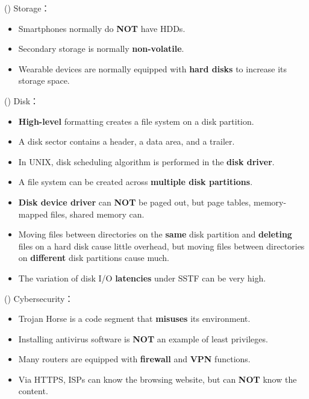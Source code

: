 \begin{theorem}{()} Storage： \begin{itemize}
        \item Smartphones normally do \textbf{NOT} have HDDs.
        \item Secondary storage is normally \textbf{non-volatile}.
        \item Wearable devices are normally equipped with \textbf{hard disks} to increase its storage space.
    \end{itemize}
\end{theorem}

\begin{theorem}{()} Disk： \begin{itemize}
        \item \textbf{High-level} formatting creates a file system on a disk partition.
        \item A disk sector contains a header, a data area, and a trailer.
        \item In UNIX, disk scheduling algorithm is performed in the \textbf{disk driver}.
        \item A file system can be created across \textbf{multiple disk partitions}.
        \item \textbf{Disk device driver} can \textbf{NOT} be paged out, but page tables, memory-mapped files, shared memory can.
        \item Moving files between directories on the \textbf{same} disk partition and \textbf{deleting} files on a hard disk cause little overhead, but moving files between directories on \textbf{different} disk partitions cause much.
        \item The variation of disk I/O \textbf{latencies} under SSTF can be very high.
    \end{itemize}
\end{theorem}

\begin{theorem}{()} Cybersecurity： \begin{itemize}
        \item Trojan Horse is a code segment that \textbf{misuses} its environment.
        \item Installing antivirus software is \textbf{NOT} an example of least privileges.
        \item Many routers are equipped with \textbf{firewall} and \textbf{VPN} functions.
        \item Via HTTPS, ISPs can know the browsing website, but can \textbf{NOT} know the content.
    \end{itemize}
\end{theorem}

